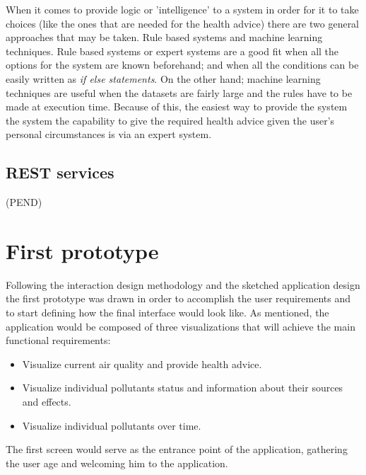 When it comes to provide logic or 'intelligence' to a system in order for it to take choices (like the ones that are needed for the health advice) there are two general approaches that may be taken. Rule based systems and machine learning techniques. Rule based systems or expert systems are a good fit when all the options for the system are known beforehand; and when all the conditions can be easily written as \textit{if else statements}. On the other hand; machine learning techniques are useful when the datasets are fairly large and the rules have to be made at execution time. Because of this, the easiest way to provide the system the system the capability to give the required health advice given the user's personal circumstances is via an expert system.

\subsection{REST services}
(PEND)

\section{First prototype}
Following the interaction design methodology and the sketched application design the first prototype was drawn in order to accomplish the user requirements and to start defining how the final interface would look like. As mentioned, the application would be composed of three visualizations that will achieve the main functional requirements:

\begin{itemize}
	\item Visualize current air quality and provide health advice.
    \item Visualize individual pollutants status and information about their sources and effects.
    \item Visualize individual pollutants over time.
\end{itemize}

The first screen would serve as the entrance point of the application, gathering the user age and welcoming him to the application. 

